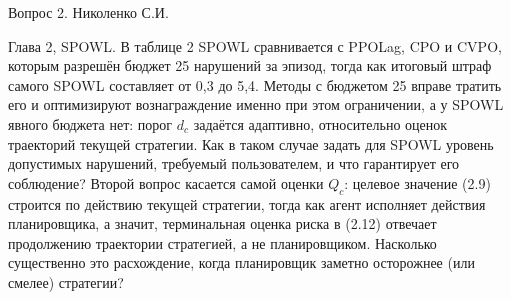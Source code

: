 \begin{frame}[noframenumbering]{Вопрос 2. Николенко С.И.}
    \begin{block}{}
        \footnotesize
        Глава 2, SPOWL. В таблице 2 SPOWL сравнивается с PPOLag, CPO и CVPO,
        которым разрешён бюджет 25 нарушений за эпизод, тогда как итоговый
        штраф самого SPOWL составляет от 0,3 до 5,4. Методы с бюджетом 25
        вправе тратить его и оптимизируют вознаграждение именно при этом
        ограничении, а у SPOWL явного бюджета нет: порог $d_c$ задаётся
        адаптивно, относительно оценок траекторий текущей стратегии. Как в
        таком случае задать для SPOWL уровень допустимых нарушений, требуемый
        пользователем, и что гарантирует его соблюдение? Второй вопрос касается
        самой оценки $Q_c$: целевое значение (2.9) строится по действию текущей
        стратегии, тогда как агент исполняет действия планировщика, а значит,
        терминальная оценка риска в (2.12) отвечает продолжению траектории
        стратегией, а не планировщиком. Насколько существенно это расхождение,
        когда планировщик заметно осторожнее (или смелее) стратегии?
    \end{block}
\end{frame}

